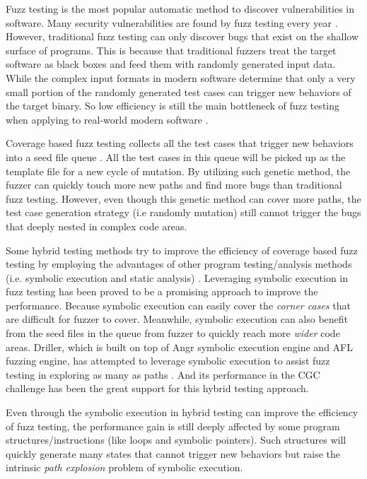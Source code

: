 Fuzz testing is the most popular automatic method to discover vulnerabilities in software. Many security vulnerabilities are found by fuzz testing every year \colorbox{red}{\cite{shit}}. However, traditional fuzz testing can only discover bugs that exist on the shallow surface of programs. This is because that traditional fuzzers treat the target software as black boxes and feed them with randomly generated input data. While the complex input formats in modern software determine that only a very small portion of the randomly generated test cases can trigger new behaviors of the target binary. So low efficiency is still the main bottleneck of fuzz testing when applying to real-world modern software \colorbox{red}{\cite{shit}}. 

Coverage based fuzz testing collects all the test cases that trigger new behaviors into a seed file queue \colorbox{red}{\cite{shit}}. All the test cases in this queue will be picked up as the template file for a new cycle of mutation. By utilizing such genetic method, the fuzzer can quickly touch more new paths and find more bugs than traditional fuzz testing. However, even though this genetic method can cover more paths, the test case generation strategy (i.e randomly mutation) still cannot trigger the bugs that deeply nested in complex code areas.  


Some hybrid testing methods try to improve the efficiency of coverage based fuzz testing by employing the advantages of other program testing/analysis methods (i.e. symbolic execution and static analysis) \colorbox{red}{\cite{shit}}. %
Leveraging symbolic execution in fuzz testing has been proved to be a promising approach to improve the performance. Because symbolic execution can easily cover the \textit{corner cases} that are difficult for fuzzer to cover. Meanwhile, symbolic execution can also benefit from the seed files in the queue from fuzzer to quickly reach more \textit{wider} code areas. Driller, which is built on top of Angr symbolic execution engine and AFL fuzzing engine, has attempted to leverage symbolic execution to assist fuzz testing in exploring as many as paths \cite{stephens2016driller}. And its performance in the CGC challenge \cite{online:CGC} has been the great support for this hybrid testing approach.

Even through the symbolic execution in hybrid testing can improve the efficiency of fuzz testing, the performance gain is still deeply affected by some program structures/instructions (like loops and symbolic pointers). Such structures will quickly generate many states that cannot trigger new behaviors but raise the intrinsic \textit{path explosion} problem of symbolic execution. 

